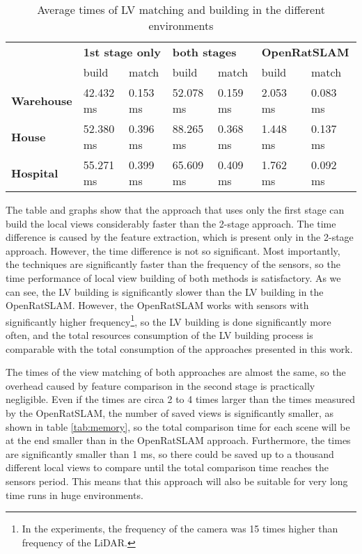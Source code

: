 \begin{table}[htpb]
    \caption{Average times of LV matching and building in the different environments}\label{tab:averageTimes}
    \centering
    \begin{tabular}{l | l  l| l l| l l}
        \toprule
        \textbf{}          & \multicolumn{2}{l|}{\textbf{1st stage only}} & \multicolumn{2}{l|}{\textbf{both stages}} & \multicolumn{2}{l}{\textbf{OpenRatSLAM}}                                  \\
        {}                 & build                                        & match                                     & build                                    & match    & build    & match    \\
        \hline
        \textbf{Warehouse} & 42.432 ms                                    & 0.153 ms                                  & 52.078 ms                                & 0.159 ms & 2.053 ms & 0.083 ms \\
        \textbf{House}     & 52.380 ms                                    & 0.396 ms                                  & 88.265 ms                                & 0.368 ms & 1.448 ms & 0.137 ms \\
        \textbf{Hospital}  & 55.271 ms                                    & 0.399 ms                                  & 65.609 ms                                & 0.409 ms & 1.762 ms & 0.092 ms \\
        \bottomrule
    \end{tabular}
\end{table}

The table and graphs show that the approach that uses only the first stage can build the local views considerably faster than the 2-stage approach. The time difference is caused by the feature extraction, which is present only in the 2-stage approach. However, the time difference is not so significant. Most importantly, the techniques are significantly faster than the frequency of the sensors, so the time performance of local view building of both methods is satisfactory. As we can see, the LV building is significantly slower than the LV building in the OpenRatSLAM. However, the OpenRatSLAM works with sensors with significantly higher frequency\footnote{In the experiments, the frequency of the camera was 15 times higher than frequency of the LiDAR.}, so the LV building is done significantly more often, and the total resources consumption of the LV building process is comparable with the total consumption of the approaches presented in this work.\par
The times of the view matching of both approaches are almost the same, so the overhead caused by feature comparison in the second stage is practically negligible. Even if the times are circa 2 to 4 times larger than the times measured by the OpenRatSLAM, the number of saved views is significantly smaller, as shown in table \ref{tab:memory}, so the total comparison time for each scene will be at the end smaller than in the OpenRatSLAM approach. Furthermore, the times are significantly smaller than 1 ms, so there could be saved up to a thousand different local views to compare until the total comparison time reaches the sensors period. This means that this approach will also be suitable for very long time runs in huge environments.
